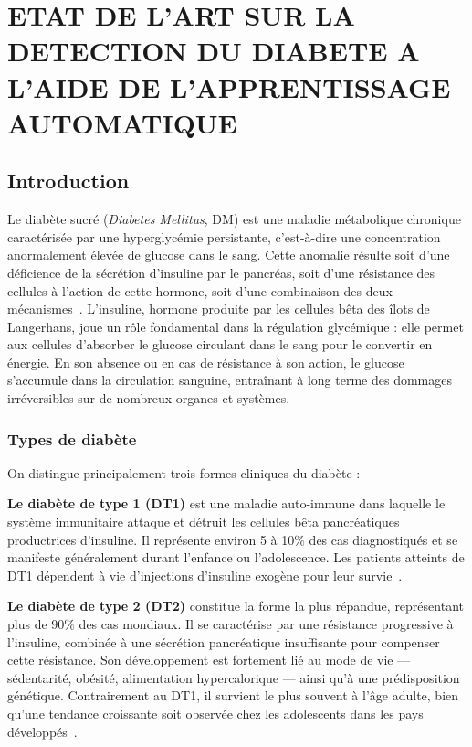 \chapter{ETAT DE L'ART SUR LA DETECTION DU DIABETE A L'AIDE DE L'APPRENTISSAGE AUTOMATIQUE}

\section{Introduction}

Le diabète sucré (\textit{Diabetes Mellitus}, DM) est une maladie métabolique chronique
caractérisée par une hyperglycémie persistante, c'est-à-dire une concentration anormalement
élevée de glucose dans le sang. Cette anomalie résulte soit d'une déficience de la sécrétion
d'insuline par le pancréas, soit d'une résistance des cellules à l'action de cette hormone,
soit d'une combinaison des deux mécanismes~\citep{iparraguirre2023}. L'insuline, hormone
produite par les cellules bêta des îlots de Langerhans, joue un rôle fondamental dans la
régulation glycémique : elle permet aux cellules d'absorber le glucose circulant dans le sang
pour le convertir en énergie. En son absence ou en cas de résistance à son action, le glucose
s'accumule dans la circulation sanguine, entraînant à long terme des dommages irréversibles
sur de nombreux organes et systèmes.

\subsection*{Types de diabète}

On distingue principalement trois formes cliniques du diabète :

\textbf{Le diabète de type 1 (DT1)} est une maladie auto-immune dans laquelle le système
immunitaire attaque et détruit les cellules bêta pancréatiques productrices d'insuline. Il
représente environ 5 à 10\% des cas diagnostiqués et se manifeste généralement durant
l'enfance ou l'adolescence. Les patients atteints de DT1 dépendent à vie d'injections
d'insuline exogène pour leur survie~\citep{iparraguirre2023, zou2018}.

\textbf{Le diabète de type 2 (DT2)} constitue la forme la plus répandue, représentant plus
de 90\% des cas mondiaux. Il se caractérise par une résistance progressive à l'insuline,
combinée à une sécrétion pancréatique insuffisante pour compenser cette résistance. Son
développement est fortement lié au mode de vie — sédentarité, obésité, alimentation
hypercalorique — ainsi qu'à une prédisposition génétique. Contrairement au DT1, il survient
le plus souvent à l'âge adulte, bien qu'une tendance croissante soit observée chez les
adolescents dans les pays développés~\citep{zou2018}.

